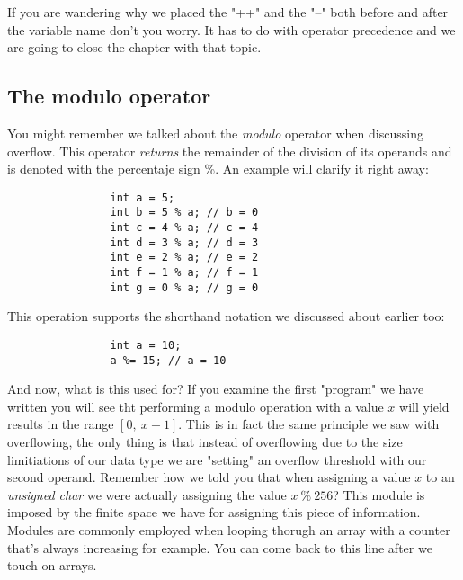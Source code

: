 \documentclass[12pt]{book}
\begin{document}
              If you are wandering why we placed the "++" and the "--" both before and after the variable name don't you worry. It has to do with operator precedence and we are going to close the chapter with that topic.

            \subsection{The modulo operator}
              You might remember we talked about the \textit{modulo} operator when discussing overflow. This operator \textit{returns} the remainder of the division of its operands and is denoted with the percentaje sign \%. An example will clarify it right away:

              \begin{verbatim}
                int a = 5;
                int b = 5 % a; // b = 0
                int c = 4 % a; // c = 4
                int d = 3 % a; // d = 3
                int e = 2 % a; // e = 2
                int f = 1 % a; // f = 1
                int g = 0 % a; // g = 0
              \end{verbatim}

              This operation supports the shorthand notation we discussed about earlier too:

              \begin{verbatim}
                int a = 10;
                a %= 15; // a = 10
              \end{verbatim}

              And now, what is this used for? If you examine the first "program" we have written you will see tht performing a modulo operation with a value $x$ will yield results in the range $[0,\ x - 1]$. This is in fact the same principle we saw with overflowing, the only thing is that instead of overflowing due to the size limitiations of our data type we are "setting" an overflow threshold with our second operand. Remember how we told you that when assigning a value $x$ to an \textit{unsigned char} we were actually assigning the value $x\ \%\ 256$? This module is imposed by the finite space we have for assigning this piece of information. Modules are commonly employed when looping thorugh an array with a counter that's always increasing for example. You can come back to this line after we touch on arrays.
\end{document}

